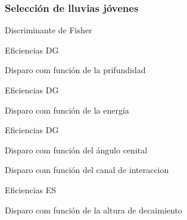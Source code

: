 \begin{frame}
 \frametitle{Selecci\'on de lluvias j\'ovenes}
 \begin{block}{Discriminante de Fisher}
 \centering
 \end{block}
\end{frame}

\begin{frame}{Eficiencias DG}
	\begin{block}{Disparo com funci\'on de la prifundidad}
		\begin{center}
		\end{center}
	\end{block}
\end{frame}

\begin{frame}{Eficiencias DG}
	\begin{block}{Disparo com funci\'on de la energ\'ia}
		\begin{center}
		\end{center}
	\end{block}
\end{frame}

\begin{frame}{Eficiencias DG}
\footnotesize
	\begin{block}{Disparo com funci\'on del \'angulo cenital}
		\begin{center}
		\hspace{3mm}
		\end{center}
	\end{block}
% 
	\begin{block}{Disparo com funci\'on del canal de interaccion}
		\begin{center}
		\hspace{3mm}
		\end{center}
	\end{block}
\end{frame}

\begin{frame}{Eficiencias ES}
	\begin{block}{Disparo com funci\'on de la altura de decaimiento}
		\begin{center}
		\end{center}
	\end{block}
\end{frame}

